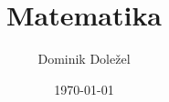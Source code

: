 \documentclass[11pt]{template/cauchy}
\title[Title for the Header]{Matematika}
\subtitle{}
\author{Dominik Doležel}
\affiliation{a kolektiv}
\date{\today}
\begin{document}


\frontmatter
\tableofcontents
\clearpage


\mainmatter

% 



\nocite{*}
\clearpage
{\small}

\backmatter

\end{document}
